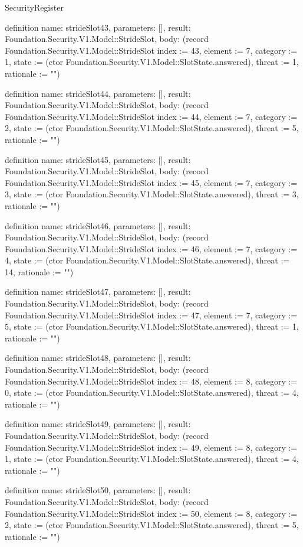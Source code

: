 \begin{lexlean}{SecurityRegister}
\begin{semanticmodule}
definition{
  name: strideSlot43,
  parameters: [],
  result: Foundation.Security.V1.Model::StrideSlot,
  body: (record Foundation.Security.V1.Model::StrideSlot {index := 43, element := 7, category := 1, state := (ctor Foundation.Security.V1.Model::SlotState.answered), threat := 1, rationale := ""})
}

definition{
  name: strideSlot44,
  parameters: [],
  result: Foundation.Security.V1.Model::StrideSlot,
  body: (record Foundation.Security.V1.Model::StrideSlot {index := 44, element := 7, category := 2, state := (ctor Foundation.Security.V1.Model::SlotState.answered), threat := 5, rationale := ""})
}

definition{
  name: strideSlot45,
  parameters: [],
  result: Foundation.Security.V1.Model::StrideSlot,
  body: (record Foundation.Security.V1.Model::StrideSlot {index := 45, element := 7, category := 3, state := (ctor Foundation.Security.V1.Model::SlotState.answered), threat := 3, rationale := ""})
}

definition{
  name: strideSlot46,
  parameters: [],
  result: Foundation.Security.V1.Model::StrideSlot,
  body: (record Foundation.Security.V1.Model::StrideSlot {index := 46, element := 7, category := 4, state := (ctor Foundation.Security.V1.Model::SlotState.answered), threat := 14, rationale := ""})
}

definition{
  name: strideSlot47,
  parameters: [],
  result: Foundation.Security.V1.Model::StrideSlot,
  body: (record Foundation.Security.V1.Model::StrideSlot {index := 47, element := 7, category := 5, state := (ctor Foundation.Security.V1.Model::SlotState.answered), threat := 1, rationale := ""})
}

definition{
  name: strideSlot48,
  parameters: [],
  result: Foundation.Security.V1.Model::StrideSlot,
  body: (record Foundation.Security.V1.Model::StrideSlot {index := 48, element := 8, category := 0, state := (ctor Foundation.Security.V1.Model::SlotState.answered), threat := 4, rationale := ""})
}

definition{
  name: strideSlot49,
  parameters: [],
  result: Foundation.Security.V1.Model::StrideSlot,
  body: (record Foundation.Security.V1.Model::StrideSlot {index := 49, element := 8, category := 1, state := (ctor Foundation.Security.V1.Model::SlotState.answered), threat := 4, rationale := ""})
}

definition{
  name: strideSlot50,
  parameters: [],
  result: Foundation.Security.V1.Model::StrideSlot,
  body: (record Foundation.Security.V1.Model::StrideSlot {index := 50, element := 8, category := 2, state := (ctor Foundation.Security.V1.Model::SlotState.answered), threat := 5, rationale := ""})
}


\end{semanticmodule}
\end{lexlean}
